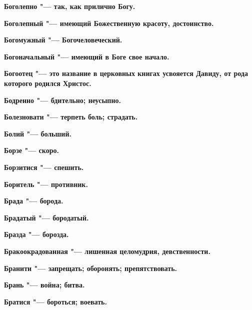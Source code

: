 \begin{mymulticols}{2}
\bfseries Боголепно\normalfont{} "--- так, как прилично Богу. 




\bfseries Боголепный\normalfont{} "--- имеющий Божественную красоту, достоинство. 




\bfseries Богомужный\normalfont{} "--- Богочеловеческий. 




\bfseries Богоначальный\normalfont{} "--- имеющий в Боге свое начало. 




\bfseries Богоотец\normalfont{} "--- это название в церковных книгах усвояется Давиду, от рода которого родился Христос. 




\bfseries Бодренно\normalfont{} "--- бдительно; неусыпно. 




\bfseries Болезновати\normalfont{} "--- терпеть боль; страдать. 




\bfseries Болий\normalfont{} "--- больший. 




\bfseries Борзе\normalfont{} "--- скоро. 




\bfseries Борзитися\normalfont{} "--- спешить. 




\bfseries Боритель\normalfont{} "--- противник. 




\bfseries Брада\normalfont{} "--- борода. 




\bfseries Брадатый\normalfont{} "--- бородатый. 




\bfseries Бразда\normalfont{} "--- борозда. 




\bfseries Бракоокрадованная\normalfont{} "--- лишенная целомудрия, девственности. 




\bfseries Бранити\normalfont{} "--- запрещать; оборонять; препятствовать. 




\bfseries Брань\normalfont{} "--- война; битва. 




\bfseries Братися\normalfont{} "--- бороться; воевать. 





\end{mymulticols}
